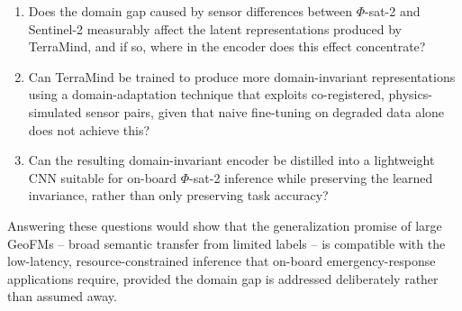 \begin{enumerate}
    \item Does the domain gap caused by sensor differences between $\Phi$-sat-2 and Sentinel-2 measurably affect the latent representations produced by TerraMind, and if so, where in the encoder does this effect concentrate?
    \item Can TerraMind be trained to produce more domain-invariant representations using a domain-adaptation technique that exploits co-registered, physics-simulated sensor pairs, given that naive fine-tuning on degraded data alone does not achieve this?
    \item Can the resulting domain-invariant encoder be distilled into a lightweight CNN suitable for on-board $\Phi$-sat-2 inference while preserving the learned invariance, rather than only preserving task accuracy?
\end{enumerate}

Answering these questions would show that the generalization promise of large GeoFMs -- broad semantic transfer from limited labels -- is compatible with the low-latency, resource-constrained inference that on-board emergency-response applications require, provided the domain gap is addressed deliberately rather than assumed away.
